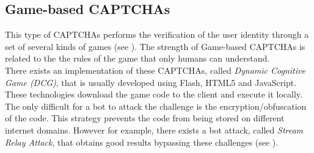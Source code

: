 \subsection{Game-based CAPTCHAs}
This type of CAPTCHAs performs the verification of the user identity through a set of several kinds of games (see ). The strength of Game-based CAPTCHAs is related to the the rules of the game that only humans can understand.\\
There exists an implementation of these CAPTCHAs, called \textit{Dynamic Cognitive Game (DCG)}, that is usually developed using Flash, HTML5 and JavaScript. These technologies download the game code to the client and execute it locally.\\
The only difficult for a bot to attack the challenge is the encryption/obfuscation of the code. This strategy prevents the code from being stored on different internet domains. However for example, there exists a bot attack, called \textit{Stream Relay Attack}, that obtains good results bypassing these challenges \cite{game_CAPTCHA} (see ).
